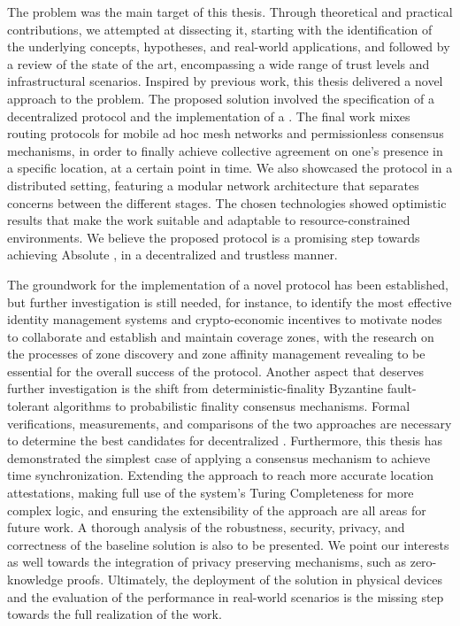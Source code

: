 The \pol{} problem was the main target of this thesis. Through theoretical and practical contributions, we attempted at dissecting it, starting with the identification of the underlying concepts, hypotheses, and real-world applications, and followed by a review of the state of the art, encompassing a wide range of trust levels and infrastructural scenarios. Inspired by previous work, this thesis delivered a novel approach to the problem. The proposed solution involved the specification of a decentralized \pol{} protocol and the implementation of a \poc{}. The final work mixes routing protocols for mobile ad hoc mesh networks and permissionless consensus mechanisms, in order to finally achieve collective agreement on one's presence in a specific location, at a certain point in time. We also showcased the protocol in a distributed setting, featuring a modular network architecture that separates concerns between the different stages. The chosen technologies showed optimistic results that make the work suitable and adaptable to resource-constrained environments. We believe the proposed protocol is a promising step towards achieving Absolute \pol{}, in a decentralized and trustless manner.

The groundwork for the implementation of a novel \pol{} protocol has been established, but further investigation is still needed, for instance, to identify the most effective identity management systems and crypto-economic incentives to motivate nodes to collaborate and establish and maintain coverage zones, with the research on the processes of zone discovery and zone affinity management revealing to be essential for the overall success of the protocol. Another aspect that deserves further investigation is the shift from deterministic-finality Byzantine fault-tolerant algorithms to probabilistic finality consensus mechanisms. Formal verifications, measurements, and comparisons of the two approaches are necessary to determine the best candidates for decentralized \pol{}. Furthermore, this thesis has demonstrated the simplest case of applying a consensus mechanism to achieve time synchronization. Extending the approach to reach more accurate location attestations, making full use of the system's Turing Completeness for more complex logic, and ensuring the extensibility of the approach are all areas for future work. A thorough analysis of the robustness, security, privacy, and correctness of the baseline solution is also to be presented. We point our interests as well towards the integration of privacy preserving mechanisms, such as zero-knowledge proofs. Ultimately, the deployment of the solution in physical devices and the evaluation of the performance in real-world scenarios is the missing step towards the full realization of the work.

